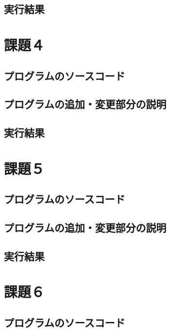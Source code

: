 \documentclass[12pt, xelatex,ja=standard,jafont=hiragino]{bxjsarticle}
\begin{document}
\subsection{実行結果}





\section{課題４}
\subsection{プログラムのソースコード}


\subsection{プログラムの追加・変更部分の説明}


\subsection{実行結果}








\section{課題５}
\subsection{プログラムのソースコード}


\subsection{プログラムの追加・変更部分の説明}


\subsection{実行結果}








\section{課題６}
\subsection{プログラムのソースコード}
\end{document}
